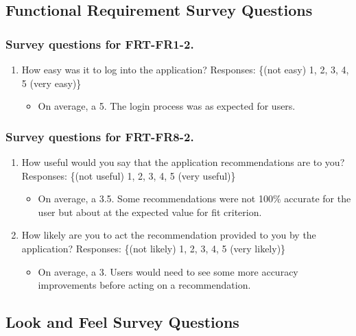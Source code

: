\documentclass[12pt, titlepage]{article}
\begin{document}
\subsection{Functional Requirement Survey Questions}
\subsubsection{Survey questions for \textbf{FRT-FR1-2}.}

\begin{enumerate}
\item How easy was it to log into the application?
Responses: \{(not easy) 1, 2, 3, 4, 5 (very easy)\} \\
  \begin{itemize}
    \item On average, a 5. The login process was as expected for users.
  \end{itemize}
\end{enumerate}

\subsubsection{Survey questions for \textbf{FRT-FR8-2}.}

\begin{enumerate}
  \item How useful would you say that the application recommendations are to you?
  Responses: \{(not useful) 1, 2, 3, 4, 5 (very useful)\} \\
    \begin{itemize}
      \item On average, a 3.5. Some recommendations were not 100\% accurate for the user but about at the
      expected value for fit criterion.
    \end{itemize}
  \item How likely are you to act the recommendation provided to you by the application?
  Responses: \{(not likely) 1, 2, 3, 4, 5 (very likely)\}
    \begin{itemize}
      \item On average, a 3. Users would need to see some more accuracy improvements before acting on a recommendation.
    \end{itemize}
\end{enumerate}

\subsection{Look and Feel Survey Questions}
\end{document}
